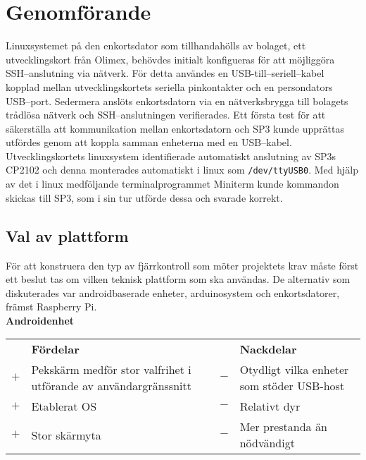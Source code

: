 \documentclass{article}
\begin{document}
    \section{Genomförande} %
    \label{sec:genomforande}
        Linuxsystemet på den enkortsdator som tillhandahölls av bolaget, ett utvecklingskort från Olimex, behövdes initialt konfigueras för att möjliggöra SSH--\-anslutning via nätverk. För detta användes en USB-till--seriell--kabel kopplad mellan utvecklingskortets seriella pinkontakter och en persondators USB--port. Sedermera anslöts enkortsdatorn via en nätverksbrygga till bolagets trådlösa nätverk och SSH--anslutningen verifierades. Ett första test för att säkerställa att kommunikation mellan enkortsdatorn och SP3 kunde upprättas utfördes genom att koppla samman enheterna med en USB--kabel. Utvecklingskortets linuxsystem identifierade automatiskt anslutning av SP3s CP2102 och denna monterades automatiskt i linux som \texttt{/dev/ttyUSB0}. Med hjälp av det i linux medföljande terminalprogrammet Miniterm kunde kommandon skickas till SP3, som i sin tur utförde dessa och svarade korrekt.

        \newpage
        \subsection{Val av plattform} %
        \label{sub:val_av_plattform}
        För att konstruera den typ av fjärrkontroll som möter projektets krav måste först ett beslut tas om vilken teknisk plattform som ska användas. De alternativ som diskuterades var androidbaserade enheter, arduinosystem och enkortsdatorer, främst Raspberry Pi.\\

        \noindent\textsf{\textbf{Androidenhet}}\\
        \begin{tabularx}{\textwidth}{@{}cXcX}
            & \textbf{Fördelar}     & & \textbf{Nackdelar} \\
            $+$ & Pekskärm medför stor valfrihet i utförande av användargränssnitt     &                            $-$ & Otydligt vilka enheter som
                                              stöder USB-host \\
            $+$ &  Etablerat OS     &   $-$ & Relativt dyr \\
            $+$ &  Stor skärmyta    &   $-$ & Mer prestanda än nödvändigt
        \end{tabularx}\\
\end{document}
